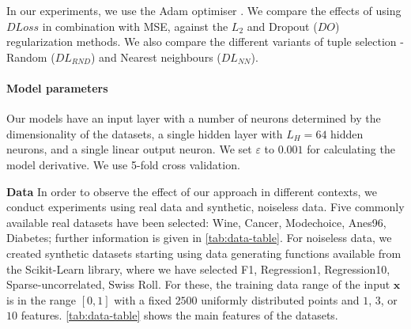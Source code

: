 \documentclass{article}
\begin{document}
In our experiments, we use the Adam optimiser \cite{kingma2015adam}.
We compare the effects of using ${DLoss}$ in combination with MSE, against the $L_2$ and Dropout ($DO$) regularization methods. 
We also compare the different variants of tuple selection - Random ($DL_{RND}$) and Nearest neighbours ($DL_{NN}$). 

\paragraph{Model parameters} Our models have an input layer with a number of neurons determined by the dimensionality of the datasets, a single hidden layer with $L_H = 64$ hidden neurons, and a single linear output neuron. 
We set $\varepsilon$ to $0.001$ for calculating the model derivative. 
We use 5-fold cross validation. 


\textbf{Data}
In order to observe the effect of our approach in different contexts, we conduct experiments using real data and synthetic, noiseless data. 
Five commonly available real datasets have been selected: Wine, Cancer, Modechoice, Anes96, Diabetes; further information is given in \autoref{tab:data-table}.
For noiseless data, we created synthetic datasets starting using data generating functions available from the Scikit-Learn library, where we have selected F1, Regression1, Regression10, Sparse-uncorrelated, Swiss Roll. 
For these, the training data range of the input $\mathbf{x}$ is in the range $[0,1]$ with a fixed $2500$ uniformly distributed points and $1$, $3$, or $10$ features.
\autoref{tab:data-table} shows the main features of the datasets.
\end{document}
